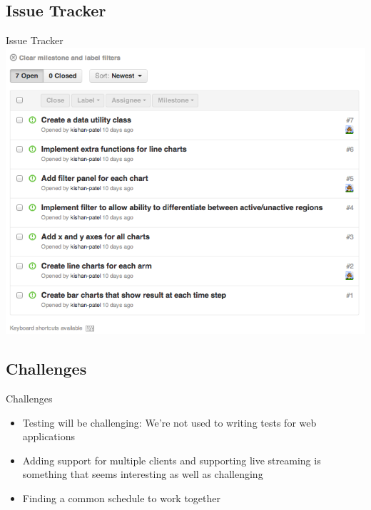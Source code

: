 \documentclass{beamer}
\begin{document}
\subsection{Issue Tracker}
\begin{frame}{Issue Tracker}
\includegraphics[scale=0.25]{gitissues.png}
\end{frame}

\subsection{Challenges}
\begin{frame}{Challenges}
\begin{itemize}
\item Testing will be challenging: We're not used to writing tests for web applications
\item Adding support for multiple clients and supporting live streaming is something that seems interesting as well as challenging
\item Finding a common schedule to work together
\end{itemize}
\end{frame}
\end{document}
